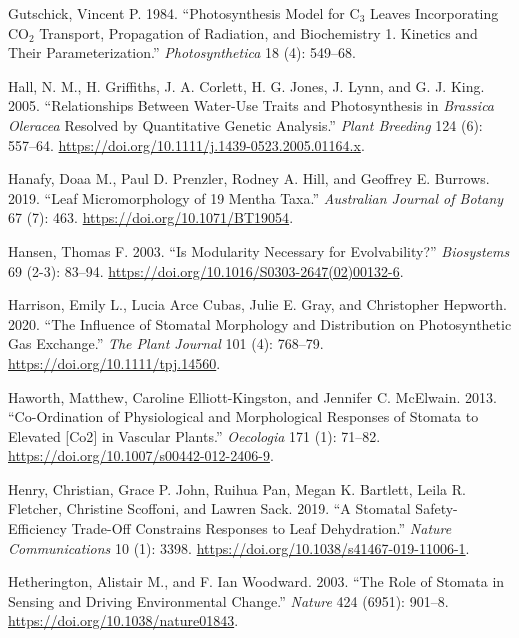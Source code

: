 \documentclass[
  12pt,
]{article}
\newlength{\cslhangindent}
\newlength{\cslentryspacingunit} %
\newenvironment{CSLReferences}[2] %
 {%
  \setlength{\parindent}{0pt}
  \ifodd #1
  \let\oldpar\par
  \def\par{\hangindent=\cslhangindent\oldpar}
  \fi
  \setlength{\parskip}{#2\cslentryspacingunit}
 }%
 {}
\begin{document}
\begin{CSLReferences}{1}{0}
\leavevmode{}%
Gutschick, Vincent P. 1984. {``Photosynthesis Model for {C}\(_{\textrm{3}}\) Leaves Incorporating {CO}\(_{\textrm{2}}\) Transport, Propagation of Radiation, and Biochemistry 1. Kinetics and Their Parameterization.''} \emph{Photosynthetica} 18 (4): 549--68.

\leavevmode{}%
Hall, N. M., H. Griffiths, J. A. Corlett, H. G. Jones, J. Lynn, and G. J. King. 2005. {``Relationships Between Water-Use Traits and Photosynthesis in \emph{{Brassica} Oleracea} Resolved by Quantitative Genetic Analysis.''} \emph{Plant Breeding} 124 (6): 557--64. \url{https://doi.org/10.1111/j.1439-0523.2005.01164.x}.

\leavevmode{}%
Hanafy, Doaa M., Paul D. Prenzler, Rodney A. Hill, and Geoffrey E. Burrows. 2019. {``Leaf Micromorphology of 19 {Mentha} Taxa.''} \emph{Australian Journal of Botany} 67 (7): 463. \url{https://doi.org/10.1071/BT19054}.

\leavevmode{}%
Hansen, Thomas F. 2003. {``Is Modularity Necessary for Evolvability?''} \emph{Biosystems} 69 (2-3): 83--94. \url{https://doi.org/10.1016/S0303-2647(02)00132-6}.

\leavevmode{}%
Harrison, Emily L., Lucia Arce Cubas, Julie E. Gray, and Christopher Hepworth. 2020. {``The Influence of Stomatal Morphology and Distribution on Photosynthetic Gas Exchange.''} \emph{The Plant Journal} 101 (4): 768--79. \url{https://doi.org/10.1111/tpj.14560}.

\leavevmode{}%
Haworth, Matthew, Caroline Elliott-Kingston, and Jennifer C. McElwain. 2013. {``Co-Ordination of Physiological and Morphological Responses of Stomata to Elevated {[}{Co2}{]} in Vascular Plants.''} \emph{Oecologia} 171 (1): 71--82. \url{https://doi.org/10.1007/s00442-012-2406-9}.

\leavevmode{}%
Henry, Christian, Grace P. John, Ruihua Pan, Megan K. Bartlett, Leila R. Fletcher, Christine Scoffoni, and Lawren Sack. 2019. {``A Stomatal Safety-Efficiency Trade-Off Constrains Responses to Leaf Dehydration.''} \emph{Nature Communications} 10 (1): 3398. \url{https://doi.org/10.1038/s41467-019-11006-1}.

\leavevmode{}%
Hetherington, Alistair M., and F. Ian Woodward. 2003. {``The Role of Stomata in Sensing and Driving Environmental Change.''} \emph{Nature} 424 (6951): 901--8. \url{https://doi.org/10.1038/nature01843}.


\end{CSLReferences}
\end{document}
